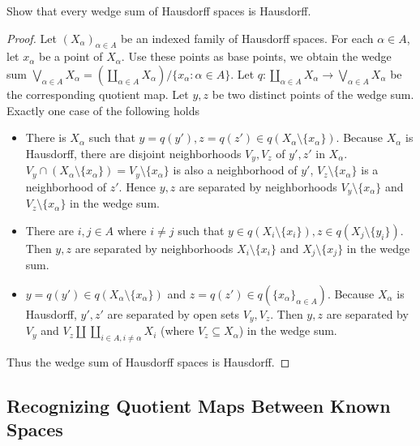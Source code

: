 \begin{exercise}{3.55}
	Show that every wedge sum of Hausdorff spaces is Hausdorff.
\end{exercise}

\begin{proof}
	Let ${(X_{\alpha})}_{\alpha\in A}$ be an indexed family of Hausdorff spaces. For each $\alpha\in A$, let $x_{\alpha}$ be a point of $X_{\alpha}$. Use these points as base points, we obtain the wedge sum $\bigvee_{\alpha\in A}X_{\alpha} = \left(\coprod_{\alpha\in A}X_{\alpha}\right)/\{ x_{\alpha} : \alpha\in A \}$. Let $q: \coprod_{\alpha\in A}X_{\alpha}\to \bigvee_{\alpha\in A}X_{\alpha}$ be the corresponding quotient map. Let $y, z$ be two distinct points of the wedge sum. Exactly one case of the following holds
	\begin{itemize}
		\item There is $X_{\alpha}$ such that $y = q(y'), z = q(z')\in q(X_{\alpha}\setminus\{ x_{\alpha} \})$. Because $X_{\alpha}$ is Hausdorff, there are disjoint neighborhoods $V_{y}, V_{z}$ of $y', z'$ in $X_{\alpha}$. $V_{y}\cap (X_{\alpha}\setminus\{ x_{\alpha} \}) = V_{y}\setminus\{ x_{\alpha} \}$ is also a neighborhood of $y'$, $V_{z}\setminus\{ x_{\alpha} \}$ is a neighborhood of $z'$. Hence $y, z$ are separated by neighborhoods $V_{y}\setminus\{ x_{\alpha} \}$ and $V_{z}\setminus\{ x_{\alpha} \}$ in the wedge sum.
		\item There are $i, j\in A$ where $i\ne j$ such that $y\in q(X_{i}\setminus\{ x_{i} \}), z\in q(X_{j}\setminus\{ y_{i} \})$. Then $y, z$ are separated by neighborhoods $X_{i}\setminus\{ x_{i} \}$ and $X_{j}\setminus\{ x_{j} \}$ in the wedge sum.
		\item $y = q(y')\in q(X_{\alpha}\setminus\{x_{\alpha}\})$ and $z = q(z')\in q({\{ x_{\alpha} \}}_{\alpha\in A})$. Because $X_{\alpha}$ is Hausdorff, $y', z'$ are separated by open sets $V_{y}, V_{z}$. Then $y, z$ are separated by $V_{y}$ and $V_{z}\amalg \coprod_{i\in A, i\ne\alpha}X_{i}$ (where $V_{z}\subseteq X_{\alpha}$) in the wedge sum.
	\end{itemize}

	Thus the wedge sum of Hausdorff spaces is Hausdorff.
\end{proof}

\subsection*{Recognizing Quotient Maps Between Known Spaces}

